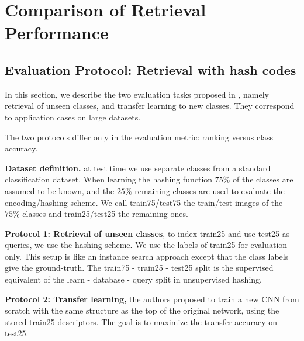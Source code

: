 \documentclass{article}
\begin{document}
\section{Comparison of Retrieval Performance} %
   
 

  
\subsection{Evaluation Protocol: Retrieval with hash codes}

In this section, we describe the two evaluation tasks proposed in \cite{sablayrolles2016should}, namely retrieval of unseen classes, and transfer learning to new classes. They correspond to application cases on large datasets. 











The two protocols differ only in the evaluation metric: ranking versus class accuracy.

\textbf{Dataset definition.} at test time we use separate classes from a standard classification dataset. When learning the hashing function $75\%$ of the classes are assumed to be known, and the $25\%$ remaining classes are used to evaluate the encoding/hashing scheme. We call train75/test75 the train/test images of the $75\%$ classes and train25/test25 the remaining ones.

\textbf{Protocol 1: Retrieval of unseen classes}, to index train25 and use test25 as queries, we use the hashing scheme. We use the labels of train25 for evaluation only. This setup is like an instance search approach except that the class labels give the ground-truth. The train75 - train25 - test25 split is the supervised equivalent of the learn - database - query split in unsupervised hashing.

\textbf{Protocol 2: Transfer learning, } the authors proposed to train a new CNN from scratch with the same structure as the top of the original network, using the stored train25 descriptors. The goal is to maximize the transfer accuracy on test25.
   
            	
\end{document}
